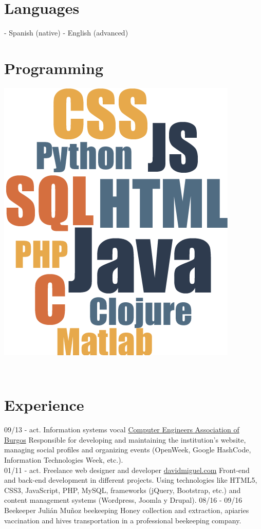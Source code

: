 \documentclass[]{friggeri-cv}
\begin{document}
\begin{aside}
  \section{Languages}
    - Spanish (native)
    - English (advanced)
    ~       
  \section{Programming\\[0.5cm]}
    \includegraphics[scale=0.9]{img/cloud.png}
    ~    
\end{aside}
~
\\ [0.8cm]
\section{Experience}
\begin{entrylist}
    \entry
    {09/13 - act.}
    {Information systems vocal}
    {\href{http://abi2burgos.es/}{Computer Engineers Association of Burgos}}
    {Responsible for developing and maintaining the institution's website, managing social profiles and organizing events (OpenWeek, Google HashCode, Information Technologies Week, etc.).\\}
    \entry
    {01/11 - act.}
    {Freelance web designer and developer}
    {\href{http://davidmiguel.com/}{davidmiguel.com}}
    {Front-end and back-end development in different projects. Using technologies like HTML5, CSS3, JavaScript, PHP, MySQL, frameworks (jQuery, Bootstrap, etc.) and content management systems (Wordpress, Joomla y Drupal).
    }
    \entry
    {08/16 - 09/16}
    {Beekeeper}
    {Julián Muñoz beekeeping}
    {Honey collection and extraction, apiaries vaccination and hives transportation in a professional beekeeping company.\\}
\end{entrylist}
\end{document}
